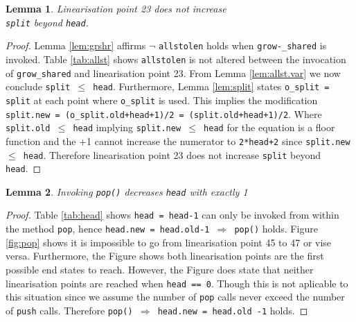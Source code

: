 \documentclass{sig-alternate-br}
\newtheorem{lemma}{Lemma}
\begin{document}
\begin{lemma}
	Linearisation point 23 does not increase\\\texttt{split} beyond \texttt{head}.
	\label{lem:lin23}
\end{lemma}
\begin{proof}
	Lemma \ref{lem:grshr} affirms $\neg$ \texttt{allstolen} holds when \texttt{grow-\_shared} is invoked.
	Table \ref{tab:allst} shows \texttt{allstolen} is not altered between the invocation of \texttt{grow\_shared} and linearisation point 23.
	From Lemma \ref{lem:allst.var} we now conclude \texttt{split $\leq$ head}.
	Furthermore, Lemma \ref{lem:split} states \texttt{o\_split = split} at each point where \texttt{o\_split} is used.
	This implies the modification \texttt{split.new = (o\_split.old+head+1)/2 = (split.old+head+1)/2}.
	Where \texttt{split.old $\leq$ head} implying \texttt{split.new $\leq$ head} for the equation is a floor function and the +1 cannot increase the numerator to \texttt{2*head+2} since \texttt{split.new $\leq$ head}.
	Therefore linearisation point 23 does not increase \texttt{split} beyond \texttt{head}.
\end{proof}

\begin{lemma}
	Invoking \texttt{pop()} decreases \texttt{head} with exactly 1
	\label{lem:pop.head}
\end{lemma}
\begin{proof}
	Table \ref{tab:head} shows \texttt{head = head-1} can only be invoked from within the method \texttt{pop}, hence \texttt{head.new = head.old-1 $\Rightarrow$ pop()} holds.
	Figure \ref{fig:pop} shows it is impossible to go from linearisation point 45 to 47 or vise versa. Furthermore, the Figure shows both linearisation points are the first possible end states to reach. However, the Figure does state that neither linearisation points are reached when \texttt{head == 0}. Though this is not aplicable to this situation since we assume the number of \texttt{pop} calls never exceed the number of \texttt{push} calls. Therefore \texttt{pop() $\Rightarrow$ head.new = head.old -1} holds.
\end{proof}
\end{document}
